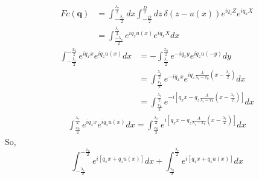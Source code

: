 \documentclass[letterpage]{article}
\begin{document}
\begin{align}
  Fc(\textbf{q}) &= \int_{-\frac{\lambda_r}{2}}^{\frac{\lambda_r}{2}}dx
    \int_{-\frac{D}{2}}^\frac{D}{2} dz \: \delta\left(z-u(x)\right)
    e^{iq_zZ} e^{iq_xX} \\
  & =\int_{\frac{-\lambda_r}{2}}^{\frac{\lambda_r}{2}} e^{iq_zu(x)}
    e^{iq_xX} dx
\end{align}
\begin{align}
  \int_{-\frac{\lambda_r}{2}}^{-\frac{x_0}{2}} e^{iq_xx} e^{iq_zu(x)}dx
    & =-\int_{\frac{\lambda_r}{2}}^{\frac{x_0}{2}} 
    e^{-iq_xy}e^{iq_zu(-y)}dy\\
  & =\int_{\frac{x_0}{2}}^{\frac{\lambda_r}{2}} e^{-iq_xx} 
    e^{iq_z\frac{A}{\lambda_r-x_0}\left(x-\frac{\lambda_r}{2}\right)}dx\\
  & =\int_{\frac{x_0}{2}}^{\frac{\lambda_r}{2}} 
    e^{-i\left[q_xx - q_z \frac{A}{\lambda_r-x_0}
    \left(x-\frac{\lambda_r}{2}\right)\right]}dx
\end{align}
\begin{align}
  \int_{\frac{x_0}{2}}^{\frac{\lambda_r}{2}} e^{iq_xx} e^{iq_zu(x)}dx
  =\int_{\frac{x_0}{2}}^{\frac{\lambda_r}{2}} 
    e^{i\left[q_xx-q_z\frac{A}{\lambda_r-x_0}
    \left(x-\frac{\lambda_r}{2}\right)\right]}dx
\end{align}
So,
\begin{equation}
  \int_{-\frac{\lambda_r}{2}}^{-\frac{x_0}{2}}
    e^{i{\left[q_xx+q_zu(x)\right]}}dx
  +\int_{\frac{x_0}{2}}^{\frac{\lambda_r}{2}}
    e^{i\left[q_xx+q_zu(x)\right]}dx
\end{equation}
\end{document}
